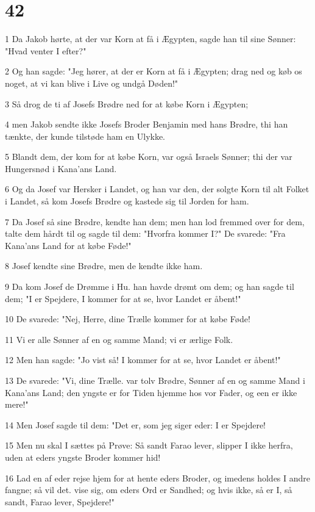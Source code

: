 \chapter{42}

\par 1 Da Jakob hørte, at der var Korn at få i Ægypten, sagde han til sine Sønner: "Hvad venter I efter?"
\par 2 Og han sagde: "Jeg hører, at der er Korn at få i Ægypten; drag ned og køb os noget, at vi kan blive i Live og undgå Døden!"
\par 3 Så drog de ti af Josefs Brødre ned for at købe Korn i Ægypten;
\par 4 men Jakob sendte ikke Josefs Broder Benjamin med hans Brødre, thi han tænkte, der kunde tilstøde ham en Ulykke.
\par 5 Blandt dem, der kom for at købe Korn, var også Israels Sønner; thi der var Hungersnød i Kana'ans Land.
\par 6 Og da Josef var Hersker i Landet, og han var den, der solgte Korn til alt Folket i Landet, så kom Josefs Brødre og kastede sig til Jorden for ham.
\par 7 Da Josef så sine Brødre, kendte han dem; men han lod fremmed over for dem, talte dem hårdt til og sagde til dem: "Hvorfra kommer I?" De svarede: "Fra Kana'ans Land for at købe Føde!"
\par 8 Josef kendte sine Brødre, men de kendte ikke ham.
\par 9 Da kom Josef de Drømme i Hu. han havde drømt om dem; og han sagde til dem; "I er Spejdere, I kommer for at se, hvor Landet er åbent!"
\par 10 De svarede: "Nej, Herre, dine Trælle kommer for at købe Føde!
\par 11 Vi er alle Sønner af en og samme Mand; vi er ærlige Folk.
\par 12 Men han sagde: "Jo vist så! I kommer for at se, hvor Landet er åbent!"
\par 13 De svarede: "Vi, dine Trælle. var tolv Brødre, Sønner af en og samme Mand i Kana'ans Land; den yngste er for Tiden hjemme hos vor Fader, og een er ikke mere!"
\par 14 Men Josef sagde til dem: "Det er, som jeg siger eder: I er Spejdere!
\par 15 Men nu skal I sættes på Prøve: Så sandt Farao lever, slipper I ikke herfra, uden at eders yngste Broder kommer hid!
\par 16 Lad en af eder rejse hjem for at hente eders Broder, og imedens holdes I andre fangne; så vil det. vise sig, om eders Ord er Sandhed; og hvis ikke, så er I, så sandt, Farao lever, Spejdere!"
